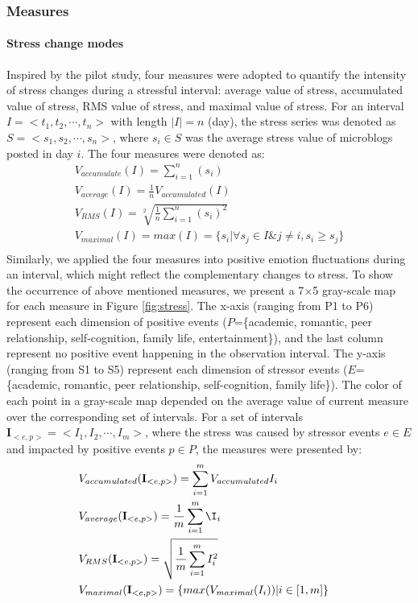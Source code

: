 \subsubsection{Measures}
\label{subsubM}
\paragraph{\textbf{Stress change modes}}
Inspired by the pilot study,
four measures were adopted to quantify the intensity of stress changes during a stressful interval:
average value of stress, accumulated value of stress, RMS value of stress, and maximal value of stress.
For an interval $I=<t_1,t_2,\cdots,t_n>$ with length $|I|=n$ (day),
the stress series was denoted as $S=<s_1,s_2,\cdots,s_n>$,
where $s_i \in S$ was the average stress value of microblogs posted in day $i$.
The four measures were denoted as: 
\begin{equation}
\begin{aligned}
&V_{accumulate}(I)= \sum_{i=1}^{n}(s_i)&\\
&V_{average}(I)= \frac{1}{n}V_{accumulated}(I)&\\
&V_{RMS}(I) = \sqrt[2]{ \frac{1}{n}\sum_{i=1}^{n}{(s_i)^2}}&\\
&V_{maximal}(I) = max(I) = \{s_i |\forall s_j \in I \& j \neq i, s_i \geq s_j\}&\\
 \end{aligned}
 \end{equation}
Similarly,
we applied the four measures into positive emotion fluctuations during an interval,
which might reflect the complementary changes to stress.
To show the occurrence of above mentioned measures,
we present a 7$\times$5 gray-scale map for each measure in Figure \ref{fig:stress}.
The x-axis (ranging from P1 to P6) represent each dimension of positive events
($P$=\{academic, romantic, peer relationship, self-cognition, family life, entertainment\}),
and the last column represent no positive event happening in the observation interval.
The y-axis (ranging from S1 to S5) represent each dimension of stressor events
($E$=\{academic, romantic, peer relationship, self-cognition, family life\}).
The color of each point in a gray-scale map depended on the average value of current measure
over the corresponding set of intervals.
For a set of intervals $\textbf{I}_{<e,p>} = <I_1,I_2,\cdots,I_m>$,
where the stress was caused by stressor events $e \in E$
and impacted by positive events $p \in P$,
the measures were presented by:
\begin{equation}
\begin{aligned}
& V_{accumulated}(\textbf{I}_{<e,p>})=\sum_{i=1}^m{V_{accumulated}I_i}&\\
& V_{average}(\textbf{I}_{<e,p>})=\frac{1}{m}\sum_{i=1}^m\I_i&\\
& V_{RMS}(\textbf{I}_{<e,p>})=\sqrt{\frac{1}{m}\sum_{i=1}^mI_i^2}&\\
& V_{maximal}(\textbf{I}_{<e,p>}) = \{max(V_{maximal}(I_i))|i\in[1,m]\} &
 \end{aligned}
 \end{equation}
